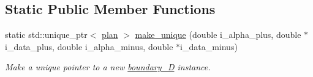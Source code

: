 \subsection*{Static Public Member Functions}
\begin{DoxyCompactItemize}
\item 
static std\-::unique\-\_\-ptr$<$ \hyperlink{classplan}{plan} $>$ \hyperlink{classboundary_1_1boundary__1_d_a058436c811856c45ee7221c544ee7783}{make\-\_\-unique} (double i\-\_\-alpha\-\_\-plus, double $\ast$i\-\_\-data\-\_\-plus, double i\-\_\-alpha\-\_\-minus, double $\ast$i\-\_\-data\-\_\-minus)
\begin{DoxyCompactList}\small\item\em Make a unique pointer to a new \hyperlink{classboundary_1_1boundary__1_d}{boundary\-\_\-D} instance. \end{DoxyCompactList}\end{DoxyCompactItemize}
